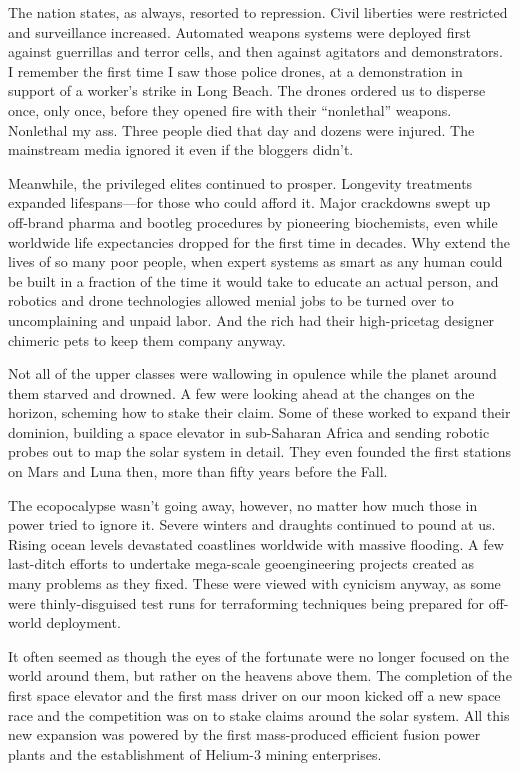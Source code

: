 The nation states, as always, resorted to repression. Civil liberties
were restricted and surveillance increased. Automated weapons systems
were deployed first against guerrillas and terror cells, and then
against agitators and demonstrators. I remember the first time I saw
those police drones, at a demonstration in support of a worker's
strike in Long Beach. The drones ordered us to disperse once, only
once, before they opened fire with their “nonlethal”
weapons. Nonlethal my ass. Three people died that day and dozens were
injured. The mainstream media ignored it even if the bloggers didn't.

Meanwhile, the privileged elites continued to prosper. Longevity
treatments expanded lifespans—for those who could afford it. Major
crackdowns swept up off-brand pharma and bootleg procedures by
pioneering biochemists, even while worldwide life expectancies dropped
for the first time in decades. Why extend the lives of so many poor
people, when expert systems as smart as any human could be built in a
fraction of the time it would take to educate an actual person, and
robotics and drone technologies allowed menial jobs to be turned over
to uncomplaining and unpaid labor. And the rich had their
high-pricetag designer chimeric pets to keep them company anyway.

Not all of the upper classes were wallowing in opulence while the
planet around them starved and drowned. A few were looking ahead at
the changes on the horizon, scheming how to stake their claim. Some of
these worked to expand their dominion, building a space elevator in
sub-Saharan Africa and sending robotic probes out to map the solar
system in detail.  They even founded the first stations on Mars and
Luna then, more than fifty years before the Fall.

The ecopocalypse wasn't going away, however, no matter how much those
in power tried to ignore it.  Severe winters and draughts continued to
pound at us.  Rising ocean levels devastated coastlines worldwide with
massive flooding. A few last-ditch efforts to undertake mega-scale
geoengineering projects created as many problems as they fixed. These
were viewed with cynicism anyway, as some were thinly-disguised test
runs for terraforming techniques being prepared for off-world
deployment.

It often seemed as though the eyes of the fortunate were no longer
focused on the world around them, but rather on the heavens above
them. The completion of the first space elevator and the first mass
driver on our moon kicked off a new space race and the competition was
on to stake claims around the solar system. All this new expansion was
powered by the first mass-produced efficient fusion power plants and
the establishment of Helium-3 mining enterprises.

